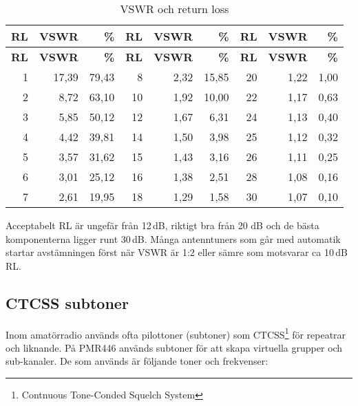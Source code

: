 \begin{longtable}{rrr|rrr|rrr}
	\caption{VSWR och return loss}\\
		\textbf{RL} & \textbf{VSWR} & \textbf{\%} & \textbf{RL} & \textbf{VSWR} & \textbf{\%} & \textbf{RL} & \textbf{VSWR} & \textbf{\%} \\ \hline 
	\endfirsthead
	\textbf{RL} & \textbf{VSWR} & \textbf{\%} & \textbf{RL} & \textbf{VSWR} & \textbf{\%} & \textbf{RL} & \textbf{VSWR} & \textbf{\%} \\ \hline 	\endhead
	          1 &         17,39 &       79,43 &           8 &          2,32 &       15,85 &          20 &          1,22 &        1,00 \\
	          2 &          8,72 &       63,10 &          10 &          1,92 &       10,00 &          22 &          1,17 &        0,63 \\
	          3 &          5,85 &       50,12 &          12 &          1,67 &        6,31 &          24 &          1,13 &        0,40 \\
	          4 &          4,42 &       39,81 &          14 &          1,50 &        3,98 &          25 &          1,12 &        0,32 \\
	          5 &          3,57 &       31,62 &          15 &          1,43 &        3,16 &          26 &          1,11 &        0,25 \\
	          6 &          3,01 &       25,12 &          16 &          1,38 &        2,51 &          28 &          1,08 &        0,16 \\
	          7 &          2,61 &       19,95 &          18 &          1,29 &        1,58 &          30 &          1,07 &        0,10
\end{longtable}

Acceptabelt RL är ungefär från 12\,dB, riktigt bra från 20 dB och de bästa komponenterna ligger runt 30\,dB. Många antenntuners som går med automatik startar avstämningen först när VSWR är 1:2 eller sämre som motsvarar ca 10\,dB\,RL.

\subsection{CTCSS subtoner}

Inom amatörradio används ofta pilottoner (subtoner) som CTCSS\footnote{Contnuous Tone-Conded Squelch System} för repeatrar och liknande. På PMR446 används subtoner för att skapa virtuella grupper och sub-kanaler. De som används är följande toner och frekvenser:

